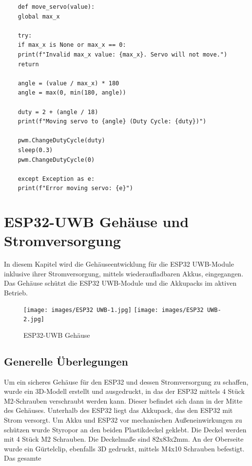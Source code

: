 \begin{lstlisting}
	def move_servo(value):
	global max_x
	
	try:
	if max_x is None or max_x == 0:
	print(f"Invalid max_x value: {max_x}. Servo will not move.")
	return
	
	angle = (value / max_x) * 180
	angle = max(0, min(180, angle)) 
	
	duty = 2 + (angle / 18)
	print(f"Moving servo to {angle} (Duty Cycle: {duty})")
	
	pwm.ChangeDutyCycle(duty)
	sleep(0.3)
	pwm.ChangeDutyCycle(0) 
	
	except Exception as e:
	print(f"Error moving servo: {e}")
\end{lstlisting}

\section{ESP32-UWB Gehäuse und Stromversorgung}
In diesem Kapitel wird die Gehäuseentwicklung für die ESP32 UWB-Module inklusive ihrer Stromversorgung, mittels wiederaufladbaren Akkus, eingegangen. Das Gehäuse schützt die ESP32 UWB-Module und die Akkupacks im aktiven Betrieb.

\begin{figure}[H]
	\centering
	\texttt{[image: images/ESP32 UWB-1.jpg]}
	\texttt{[image: images/ESP32 UWB-2.jpg]}
	\caption[ESP32-UWB Gehäuse]{ESP32-UWB Gehäuse}
	\label{fig:ESP32-UWB Gehäuse V2}
\end{figure}

\subsection{Generelle Überlegungen}
Um ein sicheres Gehäuse für den ESP32 und dessen Stromversorgung zu schaffen, wurde ein 3D-Modell erstellt und ausgedruckt, in das der ESP32 mittels 4 Stück M2-Schrauben verschraubt werden kann. Dieser befindet sich dann in der Mitte des Gehäuses. Unterhalb des ESP32 liegt das Akkupack, das den ESP32 mit Strom versorgt.
Um Akku und ESP32 vor  mechanischen Außeneinwirkungen zu schützen wurde Styropor an den beiden Plastikdeckel geklebt. Die Deckel werden mit 4 Stück M2 Schrauben. 
Die Deckelmaße sind 82x83x2mm. An der Oberseite wurde ein Gürtelclip, ebenfalls 3D gedruckt, mittels M4x10 Schrauben befestigt. Das gesamte 

